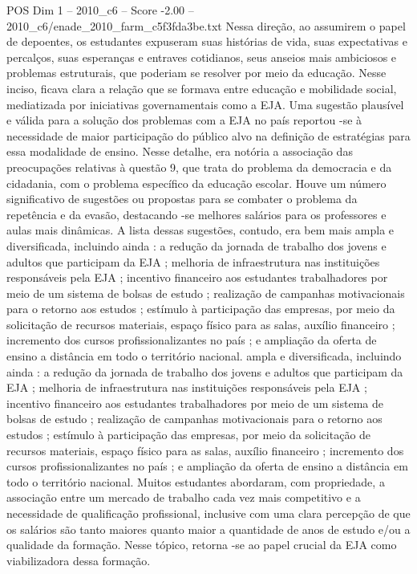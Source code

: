 \begin{textsample}{POS Dim 1 – 2010\_c6 – Score -2.00 – 2010\_c6/enade\_2010\_farm\_c5f3fda3be.txt}
Nessa direção, ao assumirem o papel de depoentes, os estudantes expuseram suas histórias de vida, suas expectativas e percalços, suas esperanças e entraves cotidianos, seus anseios mais ambiciosos e problemas estruturais, que poderiam se resolver por meio da educação.
Nesse inciso, ficava clara a relação que se formava entre educação e mobilidade social, mediatizada por iniciativas governamentais como a EJA.
Uma sugestão plausível e válida para a solução dos problemas com a EJA no país reportou -se à necessidade de maior participação do público alvo na definição de estratégias para essa modalidade de ensino.
Nesse detalhe, era notória a associação das preocupações relativas à questão 9, que trata do problema da democracia e da cidadania, com o problema específico da educação escolar.
Houve um número significativo de sugestões ou propostas para se combater o problema da repetência e da evasão, destacando -se melhores salários para os professores e aulas mais dinâmicas.
A lista dessas sugestões, contudo, era bem mais ampla e diversificada, incluindo ainda : a redução da jornada de trabalho dos jovens e adultos que participam da EJA ; melhoria de infraestrutura nas instituições responsáveis pela EJA ; incentivo financeiro aos estudantes trabalhadores por meio de um sistema de bolsas de estudo ; realização de campanhas motivacionais para o retorno aos estudos ; estímulo à participação das empresas, por meio da solicitação de recursos materiais, espaço físico para as salas, auxílio financeiro ; incremento dos cursos profissionalizantes no país ; e ampliação da oferta de ensino a distância em todo o território nacional. ampla e diversificada, incluindo ainda : a redução da jornada de trabalho dos jovens e adultos que participam da EJA ; melhoria de infraestrutura nas instituições responsáveis pela EJA ; incentivo financeiro aos estudantes trabalhadores por meio de um sistema de bolsas de estudo ; realização de campanhas motivacionais para o retorno aos estudos ; estímulo à participação das empresas, por meio da solicitação de recursos materiais, espaço físico para as salas, auxílio financeiro ; incremento dos cursos profissionalizantes no país ; e ampliação da oferta de ensino a distância em todo o território nacional.
Muitos estudantes abordaram, com propriedade, a associação entre um mercado de trabalho cada vez mais competitivo e a necessidade de qualificação profissional, inclusive com uma clara percepção de que os salários são tanto maiores quanto maior a quantidade de anos de estudo e/ou a qualidade da formação.
Nesse tópico, retorna -se ao papel crucial da EJA como viabilizadora dessa formação.

\end{textsample}
